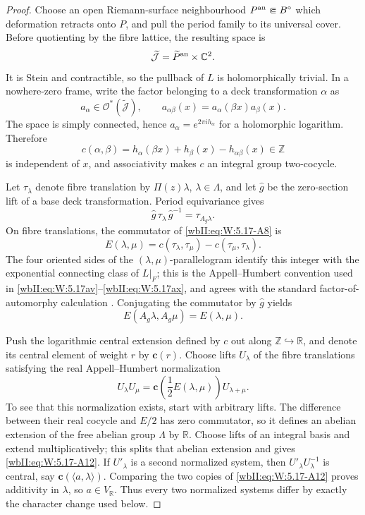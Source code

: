 \begin{proof}
Choose an open Riemann-surface neighbourhood \(P^{\rm an}\Subset B^\circ\)
which deformation retracts onto \(P\), and pull the period family to its
universal cover.  Before quotienting by the fibre lattice, the resulting
space is
\[
 \widetilde{\mathcal J}
 =\widetilde P^{\rm an}\times\mathbb C^2.
\]
It is Stein and contractible, so the pullback of \(L\) is holomorphically
trivial.  In a nowhere-zero frame, write the factor belonging to a deck
transformation \(\alpha\) as
\[
 a_\alpha\in\mathcal O^*(\widetilde{\mathcal J}),
 \qquad
 a_{\alpha\beta}(x)=a_\alpha(\beta x)a_\beta(x).
\tag{W.99}\label{wbII:eq:W:5.17-A7}
\]
The space is simply connected, hence \(a_\alpha=e^{2\pi i h_\alpha}\) for
a holomorphic logarithm.  Therefore
\[
 c(\alpha,\beta)
 =h_\alpha(\beta x)+h_\beta(x)-h_{\alpha\beta}(x)\in\mathbb Z
\tag{W.100}\label{wbII:eq:W:5.17-A8}
\]
is independent of \(x\), and associativity makes \(c\) an integral group
two-cocycle.

Let \(\tau_\lambda\) denote fibre translation by
\(\Pi(z)\lambda\), \(\lambda\in\Lambda\), and let \(\widehat g\) be the
zero-section lift of a base deck transformation.  Period equivariance gives
\[
 \widehat g\,\tau_\lambda\,\widehat g^{-1}
 =\tau_{A_g\lambda}.
\tag{W.101}\label{wbII:eq:W:5.17-A9}
\]
On fibre translations, the commutator of \eqref{wbII:eq:W:5.17-A8} is
\[
 E(\lambda,\mu)
 =c(\tau_\lambda,\tau_\mu)-c(\tau_\mu,\tau_\lambda).
\tag{W.102}\label{wbII:eq:W:5.17-A10}
\]
The four oriented sides of the \((\lambda,\mu)\)-parallelogram identify
this integer with the exponential connecting class of \(L|_F\); this is
the Appell--Humbert convention used in
\eqref{wbII:eq:W:5.17av}--\eqref{wbII:eq:W:5.17ax}, and agrees with the standard factor-of-automorphy
calculation \cite[Chapter~1, \S2, pp.~5--8, especially
Theorem~2.1, p.~7]{BirkenhakeLange1999}%
\cite[equations~(3.3)--(3.10), pp.~3--7]{SchnellLecture3}.
Conjugating the commutator by \(\widehat g\) yields
\[
 E(A_g\lambda,A_g\mu)=E(\lambda,\mu).
\tag{W.103}\label{wbII:eq:W:5.17-A11}
\]

Push the logarithmic central extension defined by \(c\) out along
\(\mathbb Z\hookrightarrow\mathbb R\), and denote its central element of
weight \(r\) by \(\mathbf c(r)\).  Choose lifts \(U_\lambda\) of the fibre
translations satisfying the real Appell--Humbert normalization
\[
 U_\lambda U_\mu
 =\mathbf c\!\left(\frac12E(\lambda,\mu)\right)U_{\lambda+\mu}.
\tag{W.104}\label{wbII:eq:W:5.17-A12}
\]
To see that this normalization exists, start with arbitrary lifts.  The
difference between their real cocycle and \(E/2\) has zero commutator, so
it defines an abelian extension of the free abelian group \(\Lambda\) by
\(\mathbb R\).  Choose lifts of an integral basis and extend
multiplicatively; this splits that abelian extension and gives \eqref{wbII:eq:W:5.17-A12}.
If \(U'_\lambda\) is a second normalized system, then
\(U'_\lambda U_\lambda^{-1}\) is central, say
\(\mathbf c(\langle a,\lambda\rangle)\).  Comparing the two copies of
\eqref{wbII:eq:W:5.17-A12} proves additivity in \(\lambda\), so
\(a\in V_{\mathbb R}\).  Thus every two normalized systems differ by exactly
the character change used below.


\end{proof}
